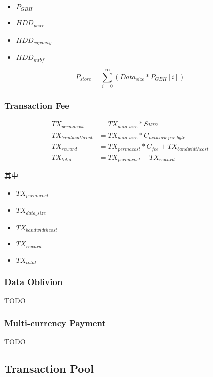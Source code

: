 \documentclass[]{article}
\begin{document}
\begin{itemize}
	\item $P_{GBH} =$
	\item $HDD_{price}$
	\item $HDD_{capacity}$
	\item ${HDD_{mtbf}}$
\end{itemize}

\begin{equation}
    P_{store} = \sum_{i = 0}^{\infty} (Data_{size} * P_{GBH}[i])
\end{equation}

\subsubsection{Transaction Fee}

\begin{align}
	TX_{permacost} &= TX_{data\_size} * Sum \\
	TX_{bandwidthcost} &= TX_{data\_size} * C_{network\_per\_byte} \\
	TX_{reward} &= TX_{permacost} * C_{fee} + TX_{bandwidthcost}	\\
	TX_{total} &= TX_{permacost} + TX_{reward}
\end{align}

其中

\begin{itemize}
	\item $TX_{permacost}$
	\item $TX_{data\_size}$
	\item $TX_{bandwidthcost}$
	\item $TX_{reward}$
	\item ${TX_{total}}$
\end{itemize}

\subsubsection{Data Oblivion}

TODO

\subsubsection{Multi-currency Payment}

TODO

\subsection{Transaction Pool}
\end{document}

